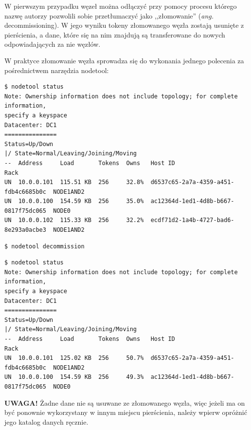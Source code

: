 \documentclass{article} %
\begin{document}
W pierwszym przypadku węzeł można odłączyć przy pomocy procesu którego nazwę autorzy pozwolili sobie przetłumaczyć jako ,,złomowanie'' (\emph{ang.} decommissioning).
W jego wyniku tokeny złomowanego węzła zostają usunięte z pierścienia, a dane, które się na nim znajdują są transferowane do nowych odpowiadających za nie węzłów.

W praktyce złomowanie węzła sprowadza się do wykonania jednego polecenia za pośrednictwem narzędzia nodetool:

\begin{lstlisting}[style=bash, caption={stan klastra z perspektywy węzła w nim pozostającego}]
$ nodetool status
Note: Ownership information does not include topology; for complete information,
specify a keyspace
Datacenter: DC1
===============
Status=Up/Down
|/ State=Normal/Leaving/Joining/Moving
--  Address     Load       Tokens  Owns   Host ID                               Rack
UN  10.0.0.101  115.51 KB  256     32.8%  d6537c65-2a7a-4359-a451-fdb4c6685b0c  NODE1AND2
UN  10.0.0.100  154.59 KB  256     35.0%  ac12364d-1ed1-4d8b-b667-0817f75dc065  NODE0
UN  10.0.0.102  115.33 KB  256     32.2%  ecdf71d2-1a4b-4727-bad6-8e293a0acbe3  NODE1AND2
\end{lstlisting}


\begin{lstlisting}[style=bash, caption={odłączenie węzła \texttt{NODE2}}]
$ nodetool decommission
\end{lstlisting}

\begin{lstlisting}[style=bash, caption={stan klastra z perspektywy węzła w nim pozostającego po odłączeniu węzła \texttt{NODE2}}]
$ nodetool status
Note: Ownership information does not include topology; for complete information,
specify a keyspace
Datacenter: DC1
===============
Status=Up/Down
|/ State=Normal/Leaving/Joining/Moving
--  Address     Load       Tokens  Owns   Host ID                               Rack
UN  10.0.0.101  125.02 KB  256     50.7%  d6537c65-2a7a-4359-a451-fdb4c6685b0c  NODE1AND2
UN  10.0.0.100  154.59 KB  256     49.3%  ac12364d-1ed1-4d8b-b667-0817f75dc065  NODE0
\end{lstlisting}

\bigskip

\textbf{UWAGA!} Żadne dane nie są usuwane ze złomowanego węzła, więc jeżeli ma on być ponownie wykorzystany w innym miejscu pierścienia, należy wpierw opróżnić jego katalog danych ręcznie.

\bigskip
\end{document}
